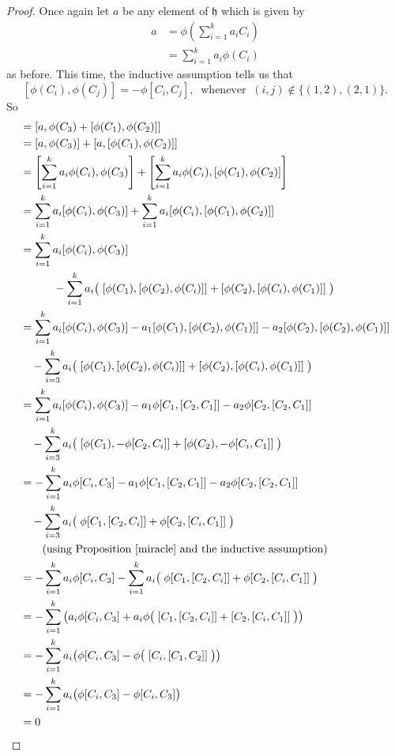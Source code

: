 \documentclass[honours]{UNSWthesis}
\newcommand{\1}{\mathbf{e}_{1}}
\newcommand{\2}{\mathbf{e}_{3}}
\newcommand{\3}{\mathbf{e}_{3}}
\begin{document}
\begin{proof}
Once again let $a$ be any element of $\mathfrak{h}$ which is given by 
\begin{align*}
a &=\phi\left(\sum\limits_{i=1}^{k}a_{i}C_{i}\right)\\
&=\sum\limits_{i=1}^{k} a_{i}\phi(C_{i})
\end{align*}
 as before.
This time, the inductive assumption tells us that 
\[
[\phi(C_{i}),\phi(C_{j})]=-\phi[C_{i},C_{j}],\;\;\text{whenever}\;\; (i,j) \notin \{(1,2),(2,1)\}.
\]
\newline
So
\begin{align*}
[a,z] &= [a,\phi(C_{3})+[\phi(C_{1}),\phi(C_{2})]] \\
&=[a,\phi(C_{3})]+[a,[\phi(C_{1}),\phi(C_{2})]] \\
&=\left[\sum\limits_{i=1}^{k} a_{i}\phi(C_{i}),\phi(C_{3}) \right]+\left[ \sum\limits_{i=1}^{k} a_{i}\phi(C_{i}),[\phi(C_{1}),\phi(C_{2})]\right] \\
&=\sum\limits_{i=1}^{k} a_{i}[\phi(C_{i}),\phi(C_{3})]+\sum\limits_{i=1}^{k} a_{i}[\phi(C_{i}),[\phi(C_{1}),\phi(C_{2})]] \\
&=\sum\limits_{i=1}^{k} a_{i}[\phi(C_{i}),\phi(C_{3})]\\
&\quad \quad \quad- \sum\limits_{i=1}^{k} a_{i}\big(\; [\phi(C_{1}),[\phi(C_{2}),\phi(C_{i})]]+[\phi(C_{2}),[\phi(C_{i}),\phi(C_{1})]]\;\big) \\
&=\sum\limits_{i=1}^{k} a_{i}[\phi(C_{i}),\phi(C_{3})]-a_{1}[\phi(C_{1}),[\phi(C_{2}),\phi(C_{1})]]-a_{2}[\phi(C_{2}),[\phi(C_{2}),\phi(C_{1})]] \\
&\quad- \sum\limits_{i=3}^{k} a_{i}\big(\; [\phi(C_{1}),[\phi(C_{2}),\phi(C_{i})]]+[\phi(C_{2}),[\phi(C_{i}),\phi(C_{1})]] \;\big) \\
&= \sum\limits_{i=1}^{k} a_{i}[\phi(C_{i}),\phi(C_{3})]-a_{1}\phi[C_{1},[C_{2},C_{1}]]-a_{2}\phi[C_{2},[C_{2},C_{1}]] \\
&\quad- \sum\limits_{i=3}^{k} a_{i}\big(\; [\phi(C_{1}),-\phi[C_{2},C_{i}]]+[\phi(C_{2}),-\phi[C_{i},C_{1}]] \;\big) \\
&=-\sum\limits_{i=1}^{k} a_{i}\phi[C_{i},C_{3}]-a_{1}\phi[C_{1},[C_{2},C_{1}]]-a_{2}\phi[C_{2},[C_{2},C_{1}]] \\
&\quad- \sum\limits_{i=3}^{k} a_{i}\big(\; \phi[C_{1},[C_{2},C_{i}]]+\phi[C_{2},[C_{i},C_{1}]] \;\big) \\
& \quad \quad \text{(using Proposition \ref{miracle} and the inductive assumption) } \\
&=-\sum\limits_{i=1}^{k} a_{i}\phi[C_{i},C_{3}]- \sum\limits_{i=1}^{k} a_{i}\big(\; \phi[C_{1},[C_{2},C_{i}]]+\phi[C_{2},[C_{i},C_{1}]] \;\big) \\
&=-\sum\limits_{i=1}^{k} \big( a_{i}\phi[C_{i},C_{3}]+ a_{i}\phi\big(\; [C_{1},[C_{2},C_{i}]]+[C_{2},[C_{i},C_{1}]] \;\big)\big) \\
&=-\sum\limits_{i=1}^{k} a_{i}\big(\phi[C_{i},C_{3}]- \phi\big(\; [C_{i},[C_{1},C_{2}]] \;\big)\big) \\
&=-\sum\limits_{i=1}^{k} a_{i}\big(\phi[C_{i},C_{3}]- \phi[C_{i},C_{3}] \big) \\
&=0
\end{align*}
\end{proof}
\end{document}
